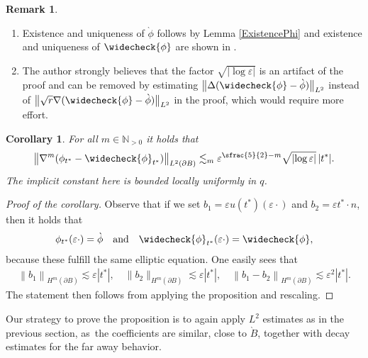 \documentclass[JEP,XML,SOM,Unicode,published]{cedram}
\let\epsilon\varepsilon
\newtheorem{corollary}[theorem]{Corollary}
\theoremstyle{definition}
\newtheorem{remark}[theorem]{Remark}
\newcommand\N{\mathbb{N}}
\newcommand\norm[1]{\left\lVert #1\right\rVert}
\newcommand\anorm[1]{\lVert #1\rVert}
\newcommand\bnorm[1]{\bigl\lVert #1\bigr\rVert}
\newcommand\eq{=}
\let\chek\widecheck
\let\de\partial
\let\eps\epsilon
\begin{document}
\skpt
\begin{remark}
\begin{enumerate}
\item
Existence and uniqueness of $\grave{\phi}$ follows by Lemma \ref{ExistencePhi} and existence and uniqueness of $\chek{\phi}$ are shown in \cite[Th.\,3.1]{Amrouche}.
\item
The author strongly believes that the factor $\sqrt{|{\log\eps}|}$ is an artifact of the proof and can be removed by estimating $\bnorm{\Delta(\chek{\phi}-\grave{\phi})}_{L^2}$ instead of $\bnorm{\sqrt{r}\nabla(\chek{\phi}-\grave{\phi})}_{L^2}$ in the proof, which would require more effort.
\end{enumerate}
\end{remark}

\begin{corollary}\label{Potential1}
For all $m\in \N_{>0}$ it holds that\vspace*{-3pt}
\begin{align*}
\bnorm{\nabla^m(\phi_{t^*}-\chek{\phi}_{t^*})}_{L^2(\de B)}\lesssim_m \eps^{\sfrac{5}{2}-m}\sqrt{|{\log\eps}|}\,|t^*|.
\end{align*}
The implicit constant here is bounded locally uniformly in $q$.
\end{corollary}
\begin{proof}[Proof of the corollary]
Observe that if we set $b_1=\eps u(t^*)(\eps\cdot)$ and $b_2=\eps t^*\cdot n$, then it holds that\vspace*{-8pt}
\begin{align*}
\phi_{t^*}(\eps\cdot)\eq\grave{\phi}\quad\text{and}\quad \chek{\phi}_{t^*}(\eps\cdot)\eq \chek{\phi},
\end{align*}
because these fulfill the same elliptic equation. One easily sees that\vspace*{-3pt}
\begin{align*}
\norm{b_1}_{H^m(\de B)}\lesssim  \eps|t^*|,\quad \anorm{b_2}_{H^m(\de B)}\lesssim  \eps|t^*|,\quad \norm{b_1-b_2}_{H^m(\de B)}\lesssim  \eps^2|t^*|.
\end{align*}
The statement then follows from applying the proposition and rescaling.\end{proof}

Our strategy to prove the proposition is to again apply $L^2$ estimates as in the previous section, as~the coefficients are similar, close to $\grave{B}$, together with decay estimates for the far away behavior.
\end{document}

